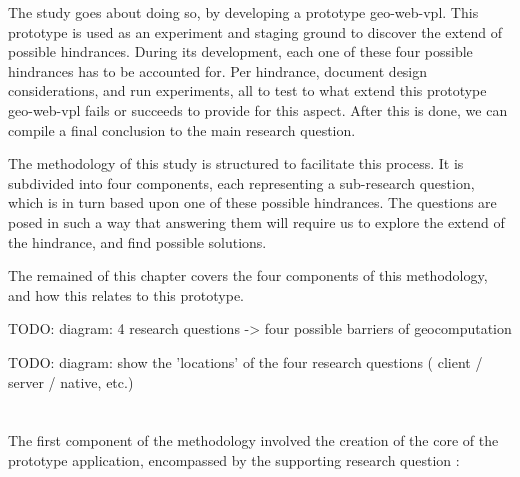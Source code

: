 The study goes about doing so, by developing a prototype \ac{geo-web-vpl}. 
This prototype is used as an experiment and staging ground to discover the extend of possible hindrances. 
During its development, each one of these four possible hindrances has to be accounted for. 
Per hindrance, document design considerations, and run experiments, all to test to what extend this prototype \ac{geo-web-vpl} fails or succeeds to provide for this aspect. 
After this is done, we can compile a final conclusion to the main research question. 

The methodology of this study is structured to facilitate this process. 
It is subdivided into four components, each representing a sub-research question, which is in turn based upon one of these possible hindrances. The questions are posed in such a way that answering them will require us to explore the extend of the hindrance, and find possible solutions.

The remained of this chapter covers the four components of this methodology, and how this relates to this prototype. 

\begin{note}
TODO: diagram: 4 research questions -> four possible barriers of geocomputation
\end{note}

\begin{note}
TODO: diagram: show the 'locations' of the four research questions ( client / server / native, etc.)
\end{note}


\section{\mySubRQOneTitle} 
\label{sec:method-one}

The first component of the methodology involved the creation of the core of the prototype application, encompassed by the supporting research question : \mySubRQOne

